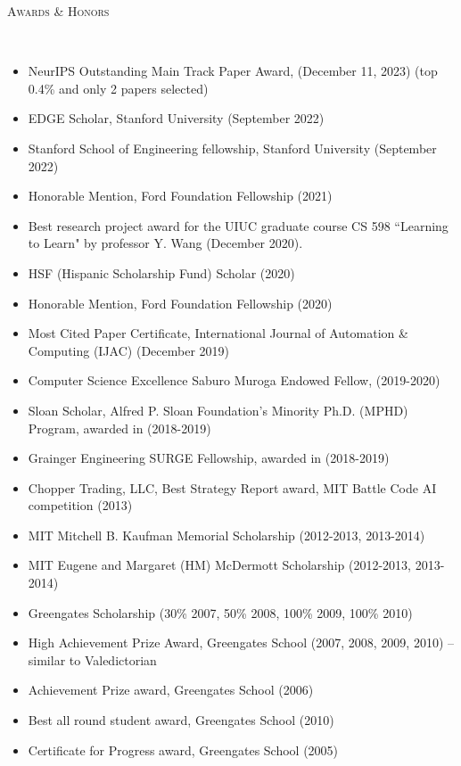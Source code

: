 \documentclass{article}
\newenvironment{changemargin}[2]{%
  \begin{list}{}{%
    \setlength{\topsep}{0pt}%
    \setlength{\leftmargin}{#1}%
    \setlength{\rightmargin}{#2}%
    \setlength{\listparindent}{\parindent}%
    \setlength{\itemindent}{\parindent}%
    \setlength{\parsep}{\parskip}%
  }%
  \item[]}{\end{list}
}
\newcommand{\lineover}{
	\begin{changemargin}{-0.05in}{-0.05in}
		\vspace*{-8pt}
		\hrulefill \\
		\vspace*{-2pt}
	\end{changemargin}
}
\newcommand{\header}[1]{
	\begin{changemargin}{-0.5in}{-0.5in}
		\scshape{#1}\\
  	\lineover
	\end{changemargin}
}
\newenvironment{body} {
	\vspace*{-16pt}
	\begin{changemargin}{-0.25in}{-0.5in}
  }	
	{\end{changemargin}
}
\begin{document}
\header{Awards \& Honors}
\begin{body}
\vspace{16pt}
\begin{itemize} \itemsep -2pt
    \item NeurIPS Outstanding Main Track Paper Award, (December 11, 2023) (top 0.4\% and only 2 papers selected)
    \item EDGE Scholar, Stanford University (September 2022)
    \item Stanford School of Engineering fellowship, Stanford University (September 2022)
    \item Honorable Mention, Ford Foundation Fellowship (2021)
    \item Best research project award for the UIUC graduate course CS 598 ``Learning to Learn" by professor Y. Wang (December 2020).
    \item HSF (Hispanic Scholarship Fund) Scholar (2020)
    \item Honorable Mention, Ford Foundation Fellowship (2020)
    \item Most Cited Paper Certificate, International Journal of Automation \& Computing (IJAC) (December 2019)
    \item Computer Science Excellence Saburo Muroga Endowed Fellow, (2019-2020)
	\item Sloan Scholar, Alfred P. Sloan Foundation’s Minority Ph.D. (MPHD) Program, awarded in (2018-2019)
	\item Grainger Engineering SURGE Fellowship, awarded in (2018-2019)
	\item Chopper Trading, LLC, Best Strategy Report award, MIT Battle Code AI competition (2013)
	\item MIT Mitchell B. Kaufman Memorial Scholarship (2012-2013, 2013-2014)
	\item MIT Eugene and Margaret (HM) McDermott Scholarship (2012-2013, 2013-2014)
 	\item Greengates Scholarship (30\% 2007, 50\% 2008, 100\% 2009, 100\% 2010)
	\item High Achievement Prize Award, Greengates School (2007, 2008, 2009, 2010) -- similar to Valedictorian
        \item Achievement Prize award, Greengates School (2006)
	\item Best all round student award, Greengates School (2010)
	\item Certificate for Progress award, Greengates School (2005)
\end{itemize}
\end{body}
\end{document}
